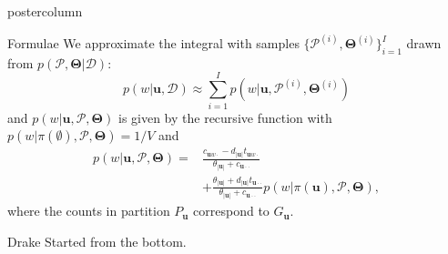 \documentclass[roundedcorners=true, titleposition=left]{beamerSEG2021poster}
\begin{document}
\begin{frame}
\begin{columns}
\begin{column}{0.19\textwidth}
\begin{beamercolorbox}[center, wd=\textwidth]{postercolumn}
\begin{minipage}[T]{0.95\textwidth}
\parbox[t][\columnheight]{\textwidth}{%
  \begin{block}{Formulae}
    	We approximate the integral with samples $\{\mathcal{P}^{(i)}, \boldsymbol\Theta^{(i)}\}_{i=1}^I$ drawn from $p(\mathcal{P}, \boldsymbol\Theta|\mathcal{D})$: 
  	\begin{equation}
    	p(w|\mathbf{u},\mathcal{D})\approx\sum_{i=1}^{I}p(w|\mathbf{u},\mathcal{P}^{(i)},\boldsymbol\Theta^{(i)})
        \end{equation}
  and $p(w|\mathbf{u}, \mathcal{P},\boldsymbol\Theta)$ is given by the recursive function with  $p(w|\pi(\emptyset),\mathcal{P},\boldsymbol\Theta) = 1/V$ and 
  \begin{equation}
  	\begin{split}
    	p(w|\mathbf{u},\mathcal{P},\boldsymbol\Theta) = &\frac{c_{\mathbf{u}w\cdot}-d_{|\mathbf{u}|}t_{\mathbf{u}w\cdot}}{\theta_{|\mathbf{u}|}+c_{\mathbf{u}\cdot\cdot}} \\
        &+ \frac{\theta_{|\mathbf{u}|}+d_{|\mathbf{u}|}t_{\mathbf{u}\cdot\cdot}}{\theta_{|\mathbf{u}|}+c_{\mathbf{u}\cdot\cdot}} p(w|\pi(\mathbf{u}),\mathcal{P},\boldsymbol\Theta),
        \end{split}
        \end{equation}
        where the counts in partition $P_{\mathbf{u}}$ correspond to $G_{\mathbf{u}}$.
    \end{block}
    \vfill
    \begin{block}{Drake}
    	Started from the bottom.
    \end{block}
}
\end{minipage}
\end{beamercolorbox}
\end{column}


\end{columns}
\end{frame}
\end{document}

